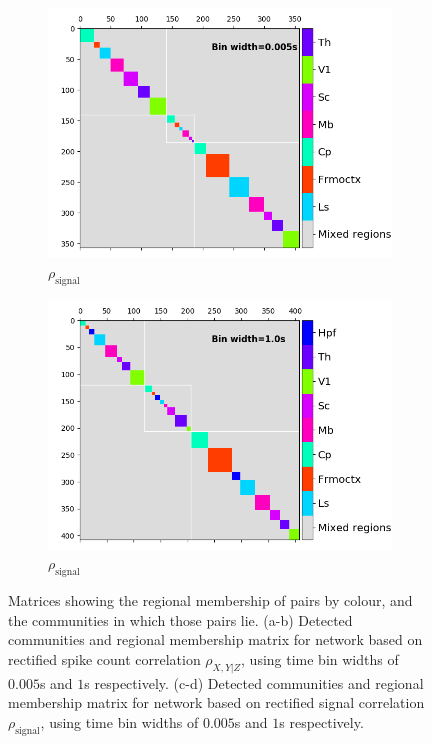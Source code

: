 \begin{figure}[h]
\begin{subfigure}[h]{0.5\linewidth}
      \includegraphics[width=\linewidth]{figures/eight_probe/Krebs_0p005_signal_rectified_regional_cluster_map.png}
      \caption{$\rho_{\text{signal}}$}
      \label{fig:short_time_signal_rectified_regional_clusters}
    \end{subfigure}
    \begin{subfigure}[h]{0.5\linewidth}
      \includegraphics[width=\linewidth]{figures/eight_probe/Krebs_1p0_signal_rectified_regional_cluster_map.png}
      \caption{$\rho_{\text{signal}}$}
      \label{fig:long_time_signal_rectified_regional_clusters}
    \end{subfigure}
    \caption{Matrices showing the regional membership of pairs by colour, and the communities in which those pairs lie. (a-b) Detected communities and regional membership matrix for network based on rectified spike count correlation $\rho_{X,Y|Z}$, using time bin widths of $0.005$s and $1$s respectively. (c-d) Detected communities and regional membership matrix for network based on rectified signal correlation $\rho_{\text{signal}}$, using time bin widths of $0.005$s and $1$s respectively.}
    \label{fig:rectified_signal_regional_clusters}
  \end{figure}

